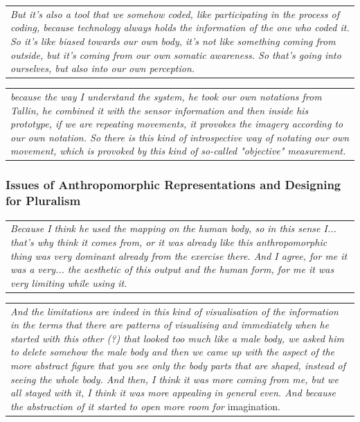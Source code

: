 \begin{center}
\begin{tabular}{ p{13cm}}
\textit{But it's also a tool that we somehow coded, like participating in the process of coding, because technology always holds the information of the one who coded it. So it's like biased towards our own body, it's not like something coming from outside, but it's coming from our own somatic awareness. So that's going into ourselves, but also into our own perception.}
\end{tabular}
\end{center}

\begin{center}
\begin{tabular}{ p{13cm}}
\textit{because the way I understand the system, he took our own notations from Tallin, he combined it with the sensor information and then inside his prototype, if we are repeating movements, it provokes the imagery according to our own notation. So there is this kind of introspective way of notating our own movement, which is provoked by this kind of so-called "objective" measurement.}
\end{tabular}
\end{center}

\subsubsection{Issues of Anthropomorphic Representations and Designing for Pluralism}

\begin{center}
\begin{tabular}{ p{13cm}}
\textit{Because I think he used the mapping on the human body, so in this sense I... that's why  think it comes from, or it was already like this anthropomorphic thing was very dominant already from the exercise there. And I agree, for me it was a very... the aesthetic of this output and the human form, for me it was very limiting while using it.}
\end{tabular}
\end{center}

\begin{center}
\begin{tabular}{ p{13cm}}
\textit{And the limitations are indeed in this kind of visualisation of the information in the terms that there are patterns of visualising and immediately when he started with this other (?) that looked too much like a male body, we asked him to delete somehow the male body and then we came up with the aspect of the more abstract figure that you see only the body parts that are shaped, instead of seeing the whole body. And then, I think it was more coming from me, but we all stayed with it, I think it was more appealing in general even. And because the abstraction of it started to open more room for} imagination.
\end{tabular}
\end{center}

